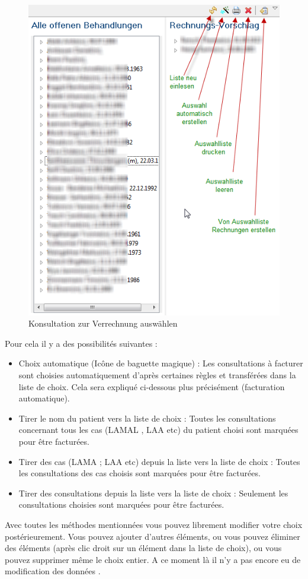 \begin{figure}[hb]
\includegraphics{images/konsv}
\caption{Konsultation zur Verrechnung auswählen}
\label {fig:konsv}
\end{figure}
Pour cela il y a des possibilités suivantes :
\begin{itemize}
  \item Choix automatique (Icône de baguette magique) : Les consultations à facturer sont choisies automatiquement d'après certaines règles et transférées dans la liste de choix. Cela sera expliqué ci-dessous plus précisément (facturation automatique).
  \item Tirer le nom du patient vers la liste de choix : Toutes les consultations concernant tous les cas (LAMAL , LAA etc) du patient choisi sont marquées pour être facturées.
  \item Tirer des cas (LAMA ; LAA etc) depuis la liste vers la liste de choix : Toutes les consultations des cas choisis sont marquées pour être facturées.
  \item Tirer des consultations depuis la liste vers la liste de choix : Seulement les consultations choisies sont marquées pour être facturées.
\end{itemize}
Avec toutes les méthodes mentionnées vous pouvez librement modifier votre choix postérieurement. Vous pouvez ajouter d'autres éléments, ou vous pouvez éliminer des éléments (après clic droit sur un élément dans la liste de choix), ou vous pouvez supprimer même le choix entier. A ce moment là il n'y a pas encore eu de modification des données .

